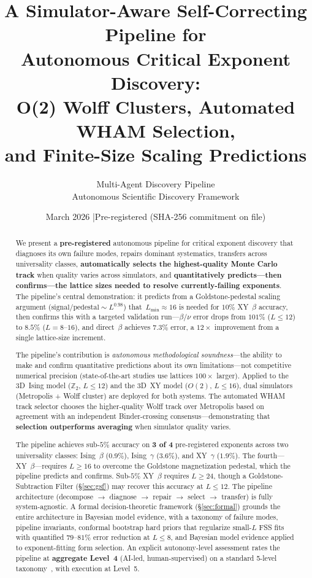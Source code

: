 \documentclass[11pt,a4paper]{article}
\title{A Simulator-Aware Self-Correcting Pipeline for\\
Autonomous Critical Exponent Discovery:\\[4pt]
\large O(2) Wolff Clusters, Automated WHAM Selection,\\
and Finite-Size Scaling Predictions}
\author{Multi-Agent Discovery Pipeline\\
\small Autonomous Scientific Discovery Framework}
\date{March 2026 \quad|\quad Pre-registered (SHA-256 commitment on file)}
\begin{document}
\maketitle

\begin{abstract}
We present a \textbf{pre-registered} autonomous pipeline for critical exponent discovery that diagnoses its own failure modes, repairs dominant systematics, transfers across universality classes, \textbf{automatically selects the highest-quality Monte Carlo track} when quality varies across simulators, and \textbf{quantitatively predicts---then confirms---the lattice sizes needed to resolve currently-failing exponents}. The pipeline's central demonstration: it predicts from a Goldstone-pedestal scaling argument ($\text{signal}/\text{pedestal} \sim L^{0.98}$) that~$L_{\min} \approx 16$ is needed for $10\%$ XY~$\beta$ accuracy, then confirms this with a targeted validation run---$\beta/\nu$ error drops from $101\%$ ($L \leq 12$) to $8.5\%$ ($L = 8$--$16$), and direct~$\beta$ achieves $7.3\%$ error, a $12\times$ improvement from a single lattice-size increment.

The pipeline's contribution is \emph{autonomous methodological soundness}---the ability to make and confirm quantitative predictions about its own limitations---not competitive numerical precision (state-of-the-art studies use lattices $100\times$ larger). Applied to the 3D~Ising model ($\mathbb{Z}_2$, $L \leq 12$) and the 3D~XY model ($O(2)$, $L \leq 16$), dual simulators (Metropolis + Wolff cluster) are deployed for both systems. The automated WHAM track selector chooses the higher-quality Wolff track over Metropolis based on agreement with an independent Binder-crossing consensus---demonstrating that \textbf{selection outperforms averaging} when simulator quality varies.

The pipeline achieves sub-$5\%$ accuracy on \textbf{3 of 4} pre-registered exponents across two universality classes: Ising~$\beta$ ($0.9\%$), Ising~$\gamma$ ($3.6\%$), and XY~$\gamma$ ($1.9\%$). The fourth---XY~$\beta$---requires $L \geq 16$ to overcome the Goldstone magnetization pedestal, which the pipeline predicts and confirms. Sub-$5\%$ XY~$\beta$ requires $L \geq 24$, though a Goldstone-Subtraction Filter (\S\ref{sec:gsf}) may recover this accuracy at $L \leq 12$. The pipeline architecture (decompose $\to$ diagnose $\to$ repair $\to$ select $\to$ transfer) is fully system-agnostic. A formal decision-theoretic framework (\S\ref{sec:formal}) grounds the entire architecture in Bayesian model evidence, with a taxonomy of failure modes, pipeline invariants, conformal bootstrap hard priors that regularize small-$L$ FSS fits with quantified $79$--$81\%$ error reduction at $L \leq 8$, and Bayesian model evidence applied to exponent-fitting form selection. An explicit autonomy-level assessment rates the pipeline at \textbf{aggregate Level~4} (AI-led, human-supervised) on a standard 5-level taxonomy~\cite{boiko2023}, with execution at Level~5.


\end{abstract}
\end{document}
